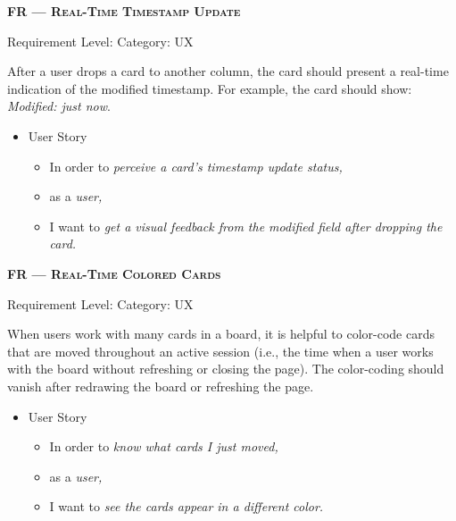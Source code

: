 \centerline{\textbf{FR\textsubscript{} --- \textsc{Real-Time Timestamp Update}}}
\centerline{\small Requirement Level:  \quad{} Category: \acrshort*{UX}}

\noindent After a user drops a card to another column, the card should present a real-time indication of the modified timestamp. For example, the card should show: \textit{Modified: just now}.


\begin{itemize}[after=\vspace{1em}]
    \setlength\itemsep{-0.5em}
	\item[] User Story\\[-7.8mm]
	\begin{itemize}
    \setlength\itemsep{-0.5em}
        \item[] In order to \textit{perceive a card’s timestamp update status,}
        \item[] as a \textit{user,}
        \item[] I want to \textit{get a visual feedback from the modified field after dropping the card.}
    \end{itemize}
\end{itemize}


\centerline{\textbf{FR\textsubscript{} --- \textsc{Real-Time Colored Cards}}}
\centerline{\small Requirement Level:  \quad{} Category: \acrshort*{UX}}

\noindent When users work with many cards in a board, it is helpful to color-code cards that are moved throughout an active session (i.e., the time when a user works with the board without refreshing or closing the page). The color-coding should vanish after redrawing the board or refreshing the page.

\begin{itemize}[after=\vspace{1em}]
    \setlength\itemsep{-0.5em}
	\item[] User Story\\[-7.8mm]
	\begin{itemize}
    \setlength\itemsep{-0.5em}
        \item[] In order to \textit{know what cards I just moved,}
        \item[] as a \textit{user,}
        \item[] I want to \textit{see the cards appear in a different color.}
    \end{itemize}
\end{itemize}



